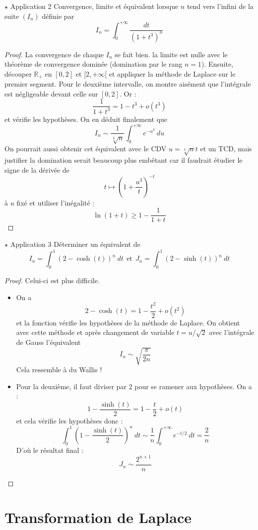 \documentclass[french,a4paper]{article}
\newcommand{\R}{\mathbb{R}}
\theoremstyle{plain}
\theoremstyle{definition}
\theoremstyle{remark}
\begin{document}
\begin{ex}[Moulin.IP.37]{$\star$ Application 2}
	Convergence, limite et équivalent lorsque $n$ tend vers l'infini de la suite $(I_n)$ définie par $$I_n=\int_{0}^{+\infty}\frac{dt}{(1+t^3)^n}$$
\end{ex}
\begin{proof}
	La convergence de chaque $I_n$ se fait bien. la limite est nulle avec le théorème de convergence dominée (domination par le rang $n=1$).  Ensuite, découper $\R_+$ en $[0,2]$ et $[2,+\infty[$ et appliquer la méthode de Laplace sur le premier segment. Pour le deuxième intervalle, on montre aisément que l'intégrale est négligeable devant celle sur $[0,2]$. Or : $$\frac{1}{1+t^3}=1-t^3+o(t^3)$$ et vérifie les hypothèses. On en déduit finalement que $$I_n\sim\frac{1}{\sqrt[3]{n}}\int_{0}^{+\infty}e^{-u^3}\ du$$ On pourrait aussi obtenir cet équivalent avec le CDV $u=\sqrt[3]{n}t$ et un TCD, mais justifier la domination serait beaucoup plus embêtant car il faudrait étudier le signe de la dérivée de $$t\mapsto\left(1+\frac{u^3}{t}\right)^{-t}$$ à $u$ fixé et utiliser l'inégalité : $$\ln(1+t)\geqslant1-\frac{1}{1+t}$$
\end{proof}

\begin{ex}[Moulin.IP.38]{$\star$ Application 3}
	Déterminer un équivalent de $$I_n=\int_{0}^{1}(2-\cosh(t))^n\ dt \ \ \text{et} \ \ J_n=\int_{0}^{1}(2-\sinh(t))^n\ dt$$
\end{ex}
\begin{proof}
	Celui-ci est plus difficile.
	\begin{itemize}
		\item On a $$2-\cosh(t)=1-\frac{t^2}{2}+o(t^2)$$ et la fonction vérifie les hypothèses de la méthode de Laplace. On obtient avec cette méthode et après changement de variable $t=u/\sqrt{2}$ avec l'intégrale de Gauss l'équivalent $$I_n\sim\sqrt{\frac{\pi}{2n}}$$ Cela ressemble à du Wallis !
		\item Pour la deuxième, il faut diviser par $2$ pour se ramener aux hypothèses. On a : $$1-\frac{\sinh(t)}{2}=1-\frac{t}{2}+o(t)$$ et cela vérifie les hypothèses donc : $$\int_{0}^{1}\left(1-\frac{\sinh(t)}{2}\right)^n\ dt\sim\frac{1}{n}\int_{0}^{+\infty}e^{-t/2}\ dt=\frac{2}{n}$$ D'où le résultat final : $$J_n\sim\frac{2^{n+1}}{n}$$
	\end{itemize}
\end{proof}

\section{Transformation de Laplace}
\end{document}
